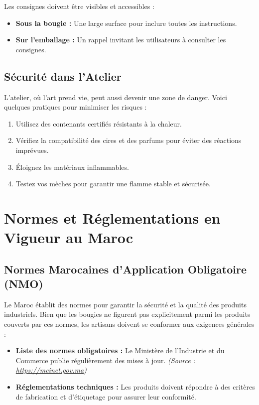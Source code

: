\documentclass[11pt,fleqn,onecolumn,oneside]{book}
\begin{document}
Les consignes doivent être visibles et accessibles :
\begin{itemize}
    \item \textbf{Sous la bougie :} Une large surface pour inclure toutes les instructions.
    \item \textbf{Sur l’emballage :} Un rappel invitant les utilisateurs à consulter les consignes.
\end{itemize}

\subsection*{Sécurité dans l’Atelier}

L’atelier, où l’art prend vie, peut aussi devenir une zone de danger. Voici quelques pratiques pour minimiser les risques :
\begin{enumerate}
    \item Utilisez des contenants certifiés résistants à la chaleur.
    \item Vérifiez la compatibilité des cires et des parfums pour éviter des réactions imprévues.
    \item Éloignez les matériaux inflammables.
    \item Testez vos mèches pour garantir une flamme stable et sécurisée.
\end{enumerate}

\section{Normes et Réglementations en Vigueur au Maroc}

\subsection*{Normes Marocaines d'Application Obligatoire (NMO)}

Le Maroc établit des normes pour garantir la sécurité et la qualité des produits industriels. Bien que les bougies ne figurent pas explicitement parmi les produits couverts par ces normes, les artisans doivent se conformer aux exigences générales :
\begin{itemize}
    \item \textbf{Liste des normes obligatoires :} Le Ministère de l’Industrie et du Commerce publie régulièrement des mises à jour. \textit{(Source : \url{https://mcinet.gov.ma})}
    \item \textbf{Réglementations techniques :} Les produits doivent répondre à des critères de fabrication et d’étiquetage pour assurer leur conformité. 
\end{itemize}
\end{document}
